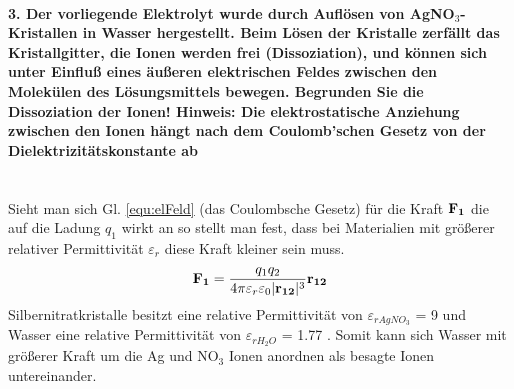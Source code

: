 \documentclass[headheight=30pt]{scrartcl}
\begin{document}
\paragraph{3. Der vorliegende Elektrolyt wurde durch Auflösen von AgNO$_3$-Kristallen in Wasser hergestellt.
    Beim Lösen der Kristalle zerfällt das Kristallgitter, die Ionen werden frei (Dissoziation), und können sich unter Einfluß eines äußeren elektrischen Feldes zwischen den Molekülen des Lösungsmittels bewegen.
    Begrunden Sie die Dissoziation der Ionen!
    Hinweis: Die elektrostatische Anziehung zwischen den Ionen hängt nach dem Coulomb’schen Gesetz von der Dielektrizitätskonstante ab} ~ \\
Sieht man sich Gl. \ref{equ:elFeld} (das Coulombsche Gesetz) für die Kraft $\vb{F_1}$ die auf die Ladung $q_1$ wirkt an so stellt man fest,
dass bei Materialien mit größerer relativer Permittivität $\varepsilon_r$ diese Kraft kleiner sein muss.
\begin{equation}
    \vb{F_1} = \frac{q_1q_2}{4\pi\varepsilon_r \varepsilon_0 |\vb{r_{12}}|^3} \vb{r_{12}}
    \label{equ:elFeld}
\end{equation}
Silbernitratkristalle besitzt eine relative Permittivität von $\varepsilon_{rAgNO_3}$ = 9 \cite{PERMS} und Wasser eine relative Permittivität von $\varepsilon_{rH_2O}$ = 1.77 \cite{PERMW}.
Somit kann sich Wasser mit größerer Kraft um die Ag und NO$_3$ Ionen anordnen als besagte Ionen untereinander.
\newpage


\printbibliography
\end{document}
